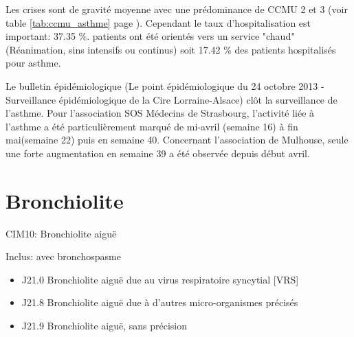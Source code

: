 \documentclass[12pt,english,french,twoside]{report}\usepackage[]{graphicx}\usepackage[]{color}
\begin{document}
Les crises sont de gravité moyenne avec une prédominance de CCMU 2 et 3 (voir table \ref{tab:ccmu_asthme} page \pageref{tab:ccmu_asthme}).
Cependant le taux d'hospitalisation est important: 37.35 \%.
 patients ont été orientés vers un service "chaud" (Réanimation, sins intensifs ou continus) soit 17.42 \% des patients hospitalisés pour asthme.

Le bulletin épidémiologique (Le point épidémiologique du 24 octobre 2013 - Surveillance épidémiologique de la Cire Lorraine-Alsace) clôt la surveillance de l’asthme. Pour l’association SOS Médecins de Strasbourg, l’activité liée à l’asthme a été particulièrement marqué de mi-avril (semaine 16) à fin mai(semaine 22) puis en semaine 40. Concernant l’association de Mulhouse, seule une forte augmentation en semaine 39 a été observée depuis début avril.

\section{Bronchiolite}

CIM10: Bronchiolite aiguë

Inclus:
    avec bronchospasme
\begin{itemize}
  \item J21.0 Bronchiolite aiguë due au virus respiratoire syncytial [VRS]
  \item J21.8 Bronchiolite aiguë due à d'autres micro-organismes précisés
  \item J21.9 Bronchiolite aiguë, sans précision
\end{itemize}
\end{document}
